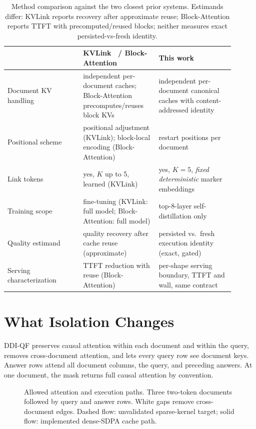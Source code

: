 \begin{table}[H]
\centering\footnotesize
\begin{tabular}{p{0.30\linewidth}p{0.30\linewidth}p{0.30\linewidth}}
\toprule
& KVLink~\citep{yang2025kvlink} / Block-Attention~\citep{ma2025blockattention} & This work \\
\midrule
Document KV handling &
independent per-document caches; Block-Attention precomputes/reuses block KVs &
independent per-document canonical caches with content-addressed identity \\
\addlinespace[2pt]
Positional scheme &
positional adjustment (KVLink); block-local encoding (Block-Attention) &
restart positions per document \\
\addlinespace[2pt]
Link tokens &
yes, $K$ up to 5, learned (KVLink) &
yes, $K{=}5$, \emph{fixed deterministic} marker embeddings \\
\addlinespace[2pt]
Training scope &
fine-tuning (KVLink: full model; Block-Attention: full model) &
top-8-layer self-distillation only \\
\addlinespace[2pt]
Quality estimand &
quality recovery after cache reuse (approximate) &
persisted vs.\ fresh execution identity (exact, gated) \\
\addlinespace[2pt]
Serving characterization &
TTFT reduction with reuse (Block-Attention) &
per-shape serving boundary, TTFT and wall, same contract \\
\bottomrule
\end{tabular}
\caption{Method comparison against the two closest prior systems. Estimands
differ: KVLink reports recovery after approximate reuse; Block-Attention
reports TTFT with precomputed/reused blocks; neither measures exact
persisted-vs-fresh identity.}
\label{tab:comparators}
\end{table}

\section{What Isolation Changes}
\label{sec:mechanism}

DDI-QF preserves causal attention within each document and within the query,
removes cross-document attention, and lets every query row see document
keys. Answer rows attend all document columns, the query, and preceding
answers. At one document, the mask returns full causal attention by
convention.

\begin{figure}[H]
\centering\resizebox{.88\linewidth}{!}{}
\caption{Allowed attention and execution paths. Three two-token documents
followed by query and answer rows. White gaps remove cross-document edges.
Dashed flow: unvalidated sparse-kernel target; solid flow: implemented
dense-SDPA cache path.}
\label{fig:mechanism}
\end{figure}

